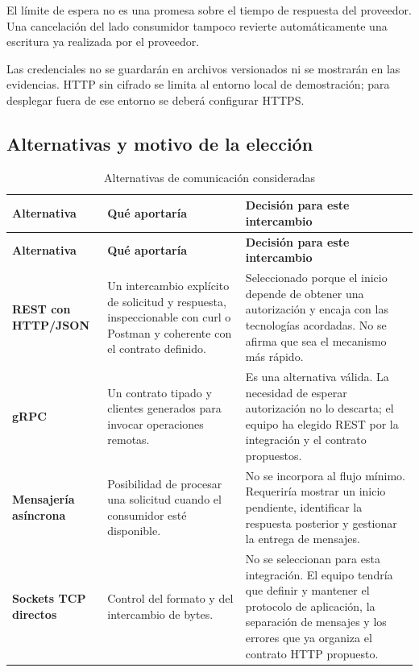 \documentclass[11pt,a4paper]{article}
\begin{document}
	El límite de espera no es una promesa sobre el tiempo de respuesta del proveedor. Una cancelación del lado consumidor tampoco revierte automáticamente una escritura ya realizada por el proveedor.
	
	Las credenciales no se guardarán en archivos versionados ni se mostrarán en las evidencias. HTTP sin cifrado se limita al entorno local de demostración; para desplegar fuera de ese entorno se deberá configurar HTTPS.
	
	\subsection{Alternativas y motivo de la elección}
	
	\begin{xltabular}{\textwidth}{L{3.2cm}XX}
		\caption{Alternativas de comunicación consideradas}\label{tab:alternativas-com}\\
		\toprule
		\textbf{Alternativa} & \textbf{Qué aportaría} & \textbf{Decisión para este intercambio} \\
		\midrule
		\endfirsthead
		\toprule
		\textbf{Alternativa} & \textbf{Qué aportaría} & \textbf{Decisión para este intercambio} \\
		\midrule
		\endhead
		\bottomrule
		\endfoot
		\textbf{REST con HTTP/JSON} & Un intercambio explícito de solicitud y respuesta, inspeccionable con curl o Postman y coherente con el contrato definido. & Seleccionado porque el inicio depende de obtener una autorización y encaja con las tecnologías acordadas. No se afirma que sea el mecanismo más rápido. \\
		\textbf{gRPC} & Un contrato tipado y clientes generados para invocar operaciones remotas. & Es una alternativa válida. La necesidad de esperar autorización no lo descarta; el equipo ha elegido REST por la integración y el contrato propuestos. \\
		\textbf{Mensajería asíncrona} & Posibilidad de procesar una solicitud cuando el consumidor esté disponible. & No se incorpora al flujo mínimo. Requeriría mostrar un inicio pendiente, identificar la respuesta posterior y gestionar la entrega de mensajes. \\
		\textbf{Sockets TCP directos} & Control del formato y del intercambio de bytes. & No se seleccionan para esta integración. El equipo tendría que definir y mantener el protocolo de aplicación, la separación de mensajes y los errores que ya organiza el contrato HTTP propuesto. \\
	\end{xltabular}
	
\end{document}
